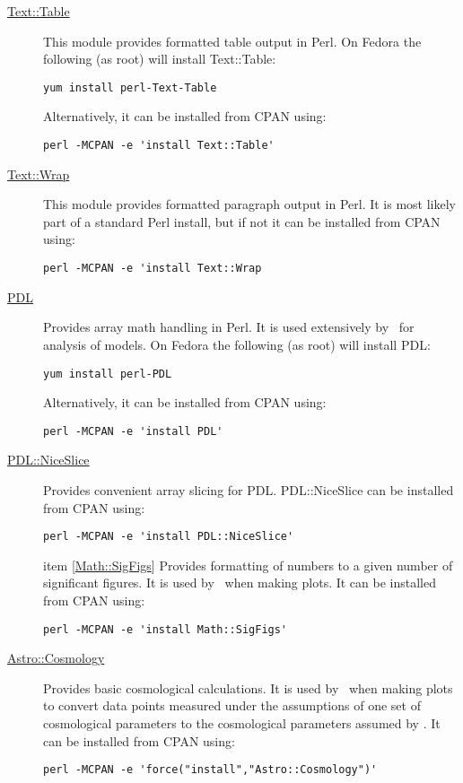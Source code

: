 \begin{description}
  \item [\href{http://search.cpan.org/~anno/Text-Table-1.114/lib/Text/Table.pm}{{\normalfont \ttfamily Text::Table}}] This module provides formatted table output in Perl. On Fedora the following (as root) will install {\normalfont \ttfamily Text::Table}:
\begin{verbatim}
yum install perl-Text-Table
\end{verbatim}
Alternatively, it can be installed from CPAN using:
\begin{verbatim}
perl -MCPAN -e 'install Text::Table'
\end{verbatim}
  \item [\href{http://search.cpan.org/~jhi/perl-5.8.0/lib/Text/Wrap.pm}{{\normalfont \ttfamily Text::Wrap}}] This module provides formatted paragraph output in Perl. It is most likely part of a standard Perl install, but if not it can be installed from CPAN using:
\begin{verbatim}
perl -MCPAN -e 'install Text::Wrap
\end{verbatim}
\item [\href{http://pdl.perl.org/}{{\normalfont \ttfamily PDL}}] Provides array math handling in Perl. It is used extensively by \glc\ for analysis of models. On Fedora the following (as root) will install {\normalfont \ttfamily PDL}:
\begin{verbatim}
yum install perl-PDL
\end{verbatim}
Alternatively, it can be installed from CPAN using:
\begin{verbatim}
perl -MCPAN -e 'install PDL'
\end{verbatim}

\item [\href{http://search.cpan.org/dist/PDL-NiceSlice/NiceSlice.pm}{{\normalfont \ttfamily PDL::NiceSlice}}] Provides convenient array slicing for PDL. {\normalfont \ttfamily PDL::NiceSlice} can be installed from CPAN using:
\begin{verbatim}
perl -MCPAN -e 'install PDL::NiceSlice'
\end{verbatim}

item [\href{http://search.cpan.org/~sbeck/Math-SigFigs-1.09/lib/Math/SigFigs.pod}{{\normalfont \ttfamily Math::SigFigs}}] Provides formatting of numbers to a given number of significant figures. It is used by \glc\ when making plots. It can be installed from CPAN using:
\begin{verbatim}
perl -MCPAN -e 'install Math::SigFigs'
\end{verbatim}

\item [\href{http://search.cpan.org/~djburke/Astro-Cosmology-0.90/Cosmology.pm}{{\normalfont \ttfamily Astro::Cosmology}}] Provides basic cosmological calculations. It is used by \glc\ when making plots to convert data points measured under the assumptions of one set of cosmological parameters to the cosmological parameters assumed by \glc. It can be installed from CPAN using:
\begin{verbatim}
perl -MCPAN -e 'force("install","Astro::Cosmology")'
\end{verbatim}
\end{description}

